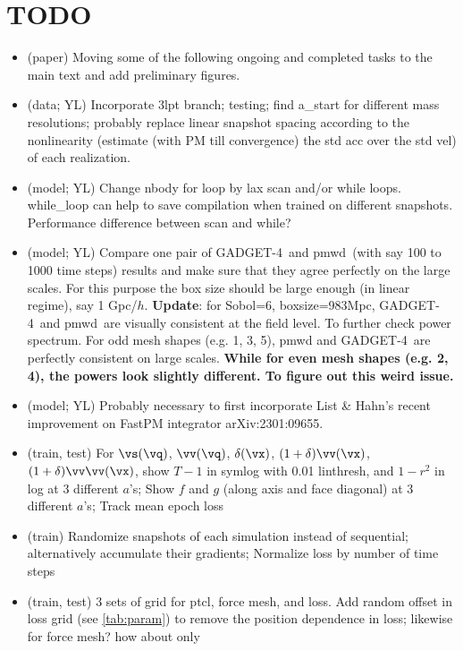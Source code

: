 \documentclass[usenatbib]{mnras}
\newcommand{\pmwd}{{\usefont{T1}{nova}{m}{sl}pmwd}}
\newcommand{\GADGET}{{{\fontsize{7.7pt}{9pt}\selectfont GADGET}-4}}
\begin{document}
\section*{TODO}
\begin{itemize}
\item (paper) Moving some of the following ongoing and completed tasks
  to the main text and add preliminary figures.
\item (data; YL) Incorporate 3lpt branch; testing; find a\_start for
  different mass resolutions; probably replace linear snapshot spacing
  according to the nonlinearity (estimate (with PM till convergence) the
  std acc over the std vel) of each realization.
\item (model; YL) Change nbody for loop by lax scan and/or while loops.
  while\_loop can help to save compilation when trained on different
  snapshots. Performance difference between scan and while?
\item (model; YL) Compare one pair of \GADGET\ and \pmwd\ (with say 100 to 1000 time
    steps) results and make sure that they agree perfectly on the large
    scales. For this purpose the box size should be large enough (in
    linear regime), say 1 Gpc/$h$.\newline
    \textbf{Update}: for Sobol=6, boxsize=983Mpc, \GADGET\ and \pmwd\ are visually
    consistent at the field level. To further check power spectrum. For odd mesh
    shapes (e.g. 1, 3, 5), pmwd and \GADGET\ are perfectly consistent on large
    scales. \textbf{While for even mesh shapes (e.g. 2, 4), the powers look
    slightly different. To figure out this weird issue.}
\item (model; YL) Probably necessary to first incorporate List \& Hahn's
  recent improvement on FastPM integrator arXiv:2301:09655.
\item (train, test) For $\vs(\vq)$, $\vv(\vq)$, $\delta(\vx)$,
  $(1+\delta)\vv(\vx)$, $(1+\delta)\vv\vv(\vx)$, show $T - 1$ in symlog
  with 0.01 linthresh, and $1-r^2$ in log at 3 different $a$'s; Show $f$
  and $g$ (along axis and face diagonal) at 3 different $a$'s; Track
  mean epoch loss
\item (train) Randomize snapshots of each simulation instead of
  sequential; alternatively accumulate their gradients; Normalize loss
  by number of time steps
\item (train, test) 3 sets of grid for ptcl, force mesh, and loss. Add
  random offset in loss grid (see \autoref{tab:param}) to remove the
  position dependence in loss; likewise for force mesh? how about only

\end{itemize}
\end{document}
